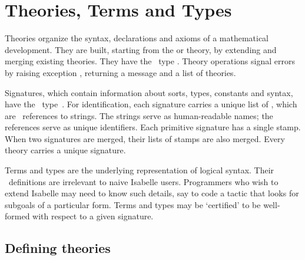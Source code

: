

\chapter{Theories, Terms and Types} \label{theories}
 Theories organize the
syntax, declarations and axioms of a mathematical development.  They
are built, starting from the {\Pure} or {\CPure} theory, by extending
and merging existing theories.  They have the \ML\ type
.  Theory operations signal errors by raising exception
, returning a message and a list of theories.

Signatures, which contain information about sorts, types, constants and
syntax, have the \ML\ type~.  For identification, each
signature carries a unique list of , which are \ML\
references to strings.  The strings serve as human-readable names; the
references serve as unique identifiers.  Each primitive signature has a
single stamp.  When two signatures are merged, their lists of stamps are
also merged.  Every theory carries a unique signature.

Terms and types are the underlying representation of logical syntax.  Their
\ML\ definitions are irrelevant to naive Isabelle users.  Programmers who
wish to extend Isabelle may need to know such details, say to code a tactic
that looks for subgoals of a particular form.  Terms and types may be
`certified' to be well-formed with respect to a given signature.


\section{Defining theories}\label{sec:ref-defining-theories}

